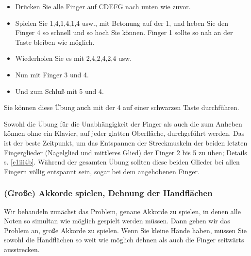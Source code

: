 \begin{itemize} 
 \item Drücken Sie alle Finger auf CDEFG nach unten wie zuvor.
 \item Spielen Sie 1,4,1,4,1,4 usw., mit Betonung auf der 1, und heben Sie den Finger 4 so schnell und so hoch Sie können.
 Finger 1 sollte so nah an der Taste bleiben wie möglich.
 \item Wiederholen Sie es mit 2,4,2,4,2,4 usw.
 \item Nun mit Finger 3 und 4.
 \item Und zum Schluß mit 5 und 4.
\end{itemize}

Sie können diese Übung auch mit der 4 auf einer schwarzen Taste durchführen.

Sowohl die Übung für die Unabhängigkeit der Finger als auch die zum Anheben können ohne ein Klavier, auf jeder glatten Oberfläche, durchgeführt werden.
Das ist der beste Zeitpunkt, um das Entspannen der Streckmuskeln der beiden letzten Fingerglieder (Nagelglied und mittleres Glied) der Finger 2 bis 5 zu üben; Details s. \hyperref[c1iii4b]{\autoref{c1iii4b}}.
Während der gesamten Übung sollten diese beiden Glieder bei allen Fingern völlig entspannt sein, sogar bei dem angehobenen Finger.
 

\subsubsection{(Große) Akkorde spielen, Dehnung der Handflächen}
\label{c1iii7e}

Wir behandeln zunächst das Problem, genaue Akkorde zu spielen, in denen alle Noten so simultan wie möglich gespielt werden müssen.
Dann gehen wir das Problem an, große Akkorde zu spielen.
Wenn Sie kleine Hände haben, müssen Sie sowohl die Handflächen so weit wie möglich dehnen als auch die Finger seitwärts ausstrecken.

